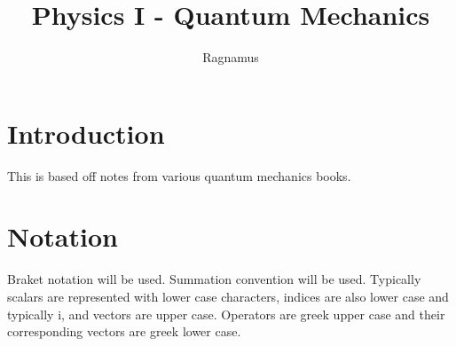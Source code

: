 \documentclass{tufte-book}
\title{Physics I - Quantum Mechanics}
\author{Ragnamus}
\newcommand{\blankpage}{\newpage\hbox{}\thispagestyle{empty}\newpage}
\begin{document}
\frontmatter

\blankpage




\maketitle



\tableofcontents

\listoffigures

\listoftables


\cleardoublepage
\chapter*{Introduction}
This is based off notes from various quantum mechanics books.\cite{Shankar1994}

\chapter*{Notation}
Braket notation will be used. Summation convention will be used. Typically scalars are represented with lower case characters, indices are also lower case and typically i, and vectors are upper case. Operators are greek upper case and their corresponding vectors are greek lower case.

\mainmatter
\end{document}
